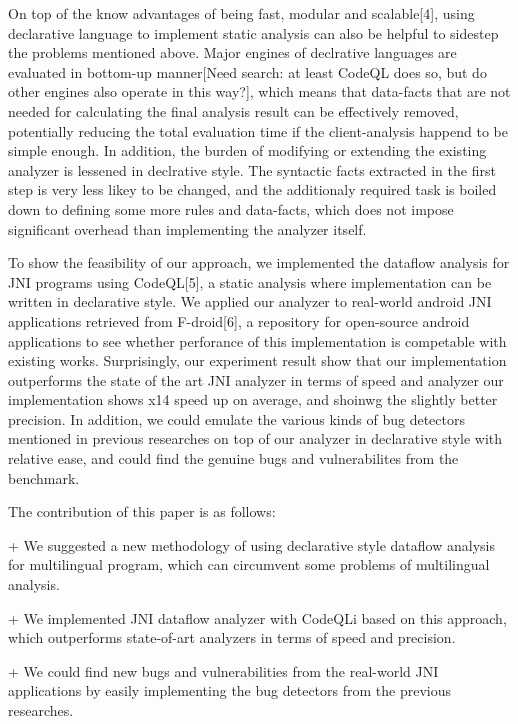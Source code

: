 On top of the know advantages of being fast, modular and scalable[4], using
declarative language to implement static analysis can also be helpful to
sidestep the problems mentioned above. Major engines of declrative languages
are evaluated in bottom-up manner[Need search: at least CodeQL does so, but do
other engines also operate in this way?], which means that data-facts that are
not needed for calculating the final analysis result can be effectively
removed, potentially reducing the total evaluation time if the client-analysis
happend to be simple enough. In addition, the burden of modifying or extending
the existing analyzer is lessened in declrative style. The syntactic facts
extracted in the first step is very less likey to be changed, and the
additionaly required task is boiled down to defining some more rules and
data-facts, which does not impose significant overhead than implementing the
analyzer itself.

To show the feasibility of our approach, we implemented the dataflow analysis
for JNI programs using CodeQL[5], a static analysis where implementation can be
written in declarative style. We applied our analyzer to real-world android JNI
applications retrieved from F-droid[6], a repository for open-source android
applications to see whether perforance of this implementation is competable
with existing works. Surprisingly, our experiment result show that our
implementation outperforms the state of the art JNI analyzer in terms of speed
and analyzer our implementation shows x14 speed up on average, and shoinwg the
slightly better precision. In addition, we could emulate the various kinds of
bug detectors mentioned in previous researches on top of our analyzer in
declarative style with relative ease, and could find the genuine bugs and
vulnerabilites from the benchmark.

The contribution of this paper is as follows:

+ We suggested a new methodology of using declarative style dataflow analysis
for multilingual program, which can circumvent some problems of multilingual analysis.

+ We implemented JNI dataflow analyzer with CodeQLi based on this approach,
which outperforms state-of-art analyzers in terms of speed and precision.

+ We could find new bugs and vulnerabilities from the real-world JNI applications
by easily implementing the bug detectors from the previous researches.
